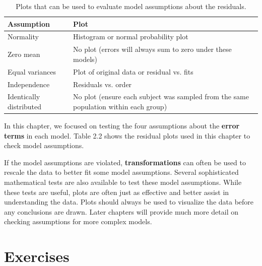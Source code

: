 \documentclass[
]{book}
\begin{document}
\begin{table}[!h]
\centering
\caption{\label{tab:tab3} Plots that can be used to evaluate model assumptions about the residuals.}
\centering
\begin{tabular}[t]{ll}
\toprule
Assumption & Plot\\
\midrule
Normality & Histogram or normal probability plot\\
Zero mean & No plot (errors will always sum to zero under these models)\\
Equal variances & Plot of original data or residual vs. fits\\
Independence & Residuals vs. order\\
Identically distributed & No plot (ensure each subject was sampled from the same population within each group)\\
\bottomrule
\end{tabular}
\end{table}

In this chapter, we focused on testing the four assumptions about the \textbf{error terms} in each model. Table 2.2 shows the residual plots used in this chapter to check model assumptions.

If the model assumptions are violated, \textbf{transformations} can often be used to rescale the data to better fit some model assumptions. Several sophisticated mathematical tests are also available to test these model assumptions. While these tests are useful, plots are often just as effective and better assist in understanding the data. Plots should always be used to visualize the data before any conclusions are drawn. Later chapters will provide much more detail on checking assumptions for more complex models.

\hypertarget{exercises-1}{%
\section*{Exercises}\label{exercises-1}}
\end{document}
